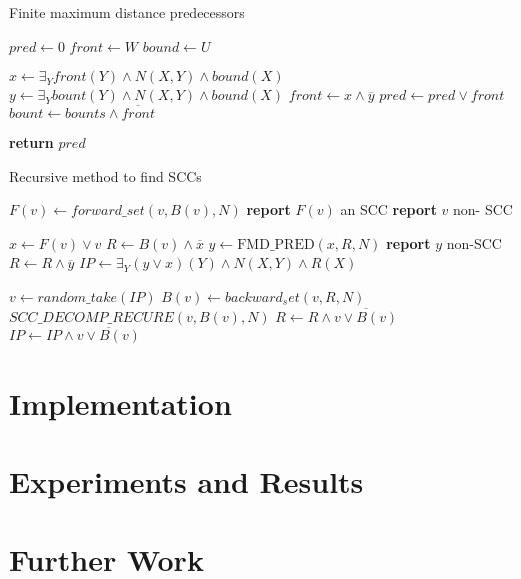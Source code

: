 \documentclass[11pt]{article}
\begin{document}
        \begin{algorithm}
            \caption{Finite maximum distance predecessors}\label{fmd}
                \State $pred \gets 0$
                \State $front \gets W$
                \State $bound \gets U$
                
                    \State $x \gets \exists_Y front(Y)\wedge N(X, Y) \wedge bound(X)$
                    \State $y \gets \exists_Y bount(Y)\wedge N(X, Y) \wedge bound(X)$
                    \State $front \gets x \wedge \overline{y}$
                    \State $pred \gets pred \vee front$
                    \State $bount \gets bounts \wedge \overline{front}$
                \EndWhile

                \State \textbf{return} $pred$
            \EndProcedure
        \end{algorithm}

        \begin{algorithm}
            \caption{Recursive method to find SCCs}\label{recursiveSCC}
                \State $F(v) \gets forward\_set(v, B(v), N)$
                    \State \textbf{report} $F(v)$ an SCC
                \Else
                    \State \textbf{report} $v$ non- SCC
                \EndIf

                \State $x \gets F(v) \vee v$
                \State $R \gets B(v) \wedge \overline{x}$
                \State $y \gets \text{FMD\_PRED}(x, R, N)$
                \State \textbf{report} $y$ non-SCC
                \State $R \gets R \wedge \overline{y}$
                \State $IP \gets \exists_Y (y\vee x)(Y)\wedge N(X,Y) \wedge R(X)$
                
                    \State $v \gets random\_take(IP)$
                    \State $B(v) \gets backward_set(v, R, N)$
                    \State $SCC\_DECOMP\_RECURE(v, B(v), N)$
                    \State $R \gets R \wedge \overline{v \vee B(v)}$
                    \State $IP \gets IP \wedge \overline {v \vee B(v)}$

            \EndProcedure
        \end{algorithm}



\section{Implementation}

\section{Experiments and Results}

\section{Further Work}


\pagebreak


\end{document}
